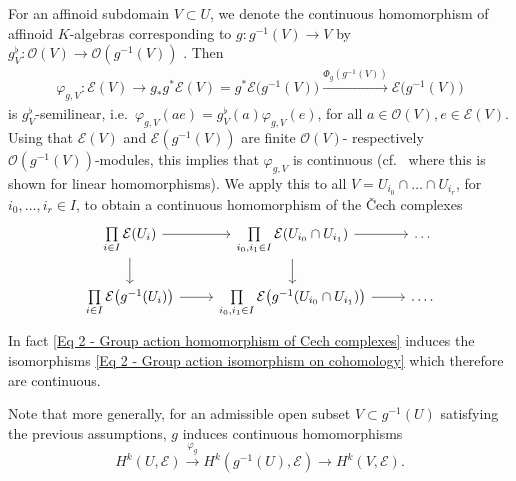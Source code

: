 \documentclass[a4paper, reqno, 10pt]{amsart}
\theoremstyle{definition}
\numberwithin{equation}{section}
\newcommand{\lra}{\longrightarrow}
\newcommand{\ra}{\rightarrow}
\newcommand{\res}[1]{{\!\,\mid_{#1}}}
\newcommand{\CE}{{\mathcal {E}}}
\newcommand{\CO}{{\mathcal {O}}}
\begin{document}
For an affinoid subdomain $V\subset U$, we denote the continuous homomorphism of affinoid $K$-algebras corresponding to $g \colon g^{-1}(V) \ra V$  by $g^\flat_V \colon \CO(V) \ra \CO(g^{-1}(V))$ .
Then
\begin{align*}
	\varphi_{g,V} \colon \CE(V) \lra g_\ast g^\ast \CE(V) = g^\ast \CE\big(g^{-1}(V)  \big) \xrightarrow{\Phi_g(g^{-1}(V))} \CE \big(g^{-1}(V) \big)
\end{align*}
is $g^\flat_V$-semilinear, i.e.\ $\varphi_{g,V}(a e)= g^\flat_{V} (a) \varphi_{g,V}(e)$, for all $a \in \CO(V), e\in \CE(V)$.
Using that $\CE(V)$ and $\CE(g^{-1}(V))$ are finite $\CO(V)$- respectively $\CO(g^{-1}(V))$-modules, this implies that $\varphi_{g,V}$ is continuous (cf.\ \cite[3.7.3 Prop.\ 2]{BoschGuentzerRemmert84NonArchAna} where this is shown for linear homomorphisms).
We apply this to all $V = U_{i_0}\cap\ldots\cap U_{i_r}$, for $i_0,\ldots,i_r\in I$, to obtain a continuous homomorphism of the \v{C}ech complexes
\begin{equation}\label{Eq 2 - Group action homomorphism of Cech complexes}
	\begin{tikzcd}
		\prod\limits_{i\in I} \CE(U_i) \arrow[r] \arrow[d] & \prod\limits_{i_0,i_1\in I} \CE(U_{i_0} \cap U_{i_1}) \arrow[d]\ar[r] & \ldots\\
		\prod\limits_{i\in I} \CE \big(g^{-1}(U_i) \big) \arrow[r]  & \prod\limits_{i_0,i_1\in I} \CE \big(g^{-1}(U_{i_0} \cap U_{i_1}) \big) \ar[r] & \ldots .
	\end{tikzcd} 
\end{equation}
In fact \eqref{Eq 2 - Group action homomorphism of Cech complexes} induces the isomorphisms \eqref{Eq 2 - Group action isomorphism on cohomology} which therefore are continuous.


Note that more generally, for an admissible open subset $V \subset g^{-1}(U)$ satisfying the previous assumptions, $g$ induces continuous homomorphisms
\begin{equation*}
	H^k(U,\CE) \overset{\varphi_g}{\lra} H^k(g^{-1}(U),\CE) \lra H^k( V,\CE) .
\end{equation*}
\end{document}
